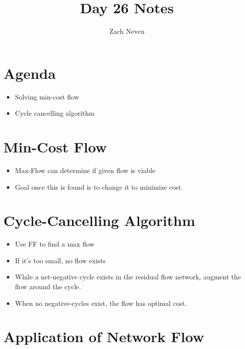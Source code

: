 \documentclass[12pt, letter]{article}
\author{Zach Neveu}
\title{ Day 26 Notes }
\begin{document}
\maketitle
\section{Agenda}%
\label{sec:agenda}

\begin{itemize}
	\item Solving min-cost flow
	\item Cycle cancelling algorithm
\end{itemize}

\section{Min-Cost Flow}%
\label{sec:min_cost_flow}
\begin{itemize}
	\item Max-Flow can determine if given flow is viable
	\item Goal once this is found is to change it to minimize cost.
\end{itemize}

\section{Cycle-Cancelling Algorithm}%
\label{sec:cycle_cancelling_algorithm}
\begin{itemize}
	\item Use FF to find a max flow
	\item If it's too small, no flow exists
	\item While a net-negative cycle exists in the residual flow network, augment the flow around the cycle.
	\item When no negative-cycles exist, the flow has optimal cost.
\end{itemize}

\section{Application of Network Flow}%
\label{sec:application_of_network_flow}
\end{document}
